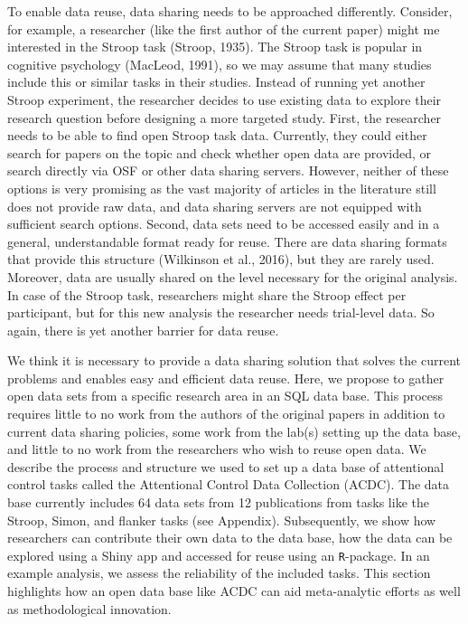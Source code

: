 \documentclass[
  man,floatsintext]{apa6}
\begin{document}
To enable data reuse, data sharing needs to be approached differently. Consider, for example, a researcher (like the first author of the current paper) might me interested in the Stroop task (Stroop, 1935). The Stroop task is popular in cognitive psychology (MacLeod, 1991), so we may assume that many studies include this or similar tasks in their studies. Instead of running yet another Stroop experiment, the researcher decides to use existing data to explore their research question before designing a more targeted study. First, the researcher needs to be able to find open Stroop task data. Currently, they could either search for papers on the topic and check whether open data are provided, or search directly via OSF or other data sharing servers. However, neither of these options is very promising as the vast majority of articles in the literature still does not provide raw data, and data sharing servers are not equipped with sufficient search options. Second, data sets need to be accessed easily and in a general, understandable format ready for reuse. There are data sharing formats that provide this structure (Wilkinson et al., 2016), but they are rarely used. Moreover, data are usually shared on the level necessary for the original analysis. In case of the Stroop task, researchers might share the Stroop effect per participant, but for this new analysis the researcher needs trial-level data. So again, there is yet another barrier for data reuse.

We think it is necessary to provide a data sharing solution that solves the current problems and enables easy and efficient data reuse. Here, we propose to gather open data sets from a specific research area in an SQL data base. This process requires little to no work from the authors of the original papers in addition to current data sharing policies, some work from the lab(s) setting up the data base, and little to no work from the researchers who wish to reuse open data. We describe the process and structure we used to set up a data base of attentional control tasks called the Attentional Control Data Collection (ACDC). The data base currently includes 64 data sets from 12 publications from tasks like the Stroop, Simon, and flanker tasks (see Appendix). Subsequently, we show how researchers can contribute their own data to the data base, how the data can be explored using a Shiny app and accessed for reuse using an \texttt{R}-package. In an example analysis, we assess the reliability of the included tasks. This section highlights how an open data base like ACDC can aid meta-analytic efforts as well as methodological innovation.
\end{document}
